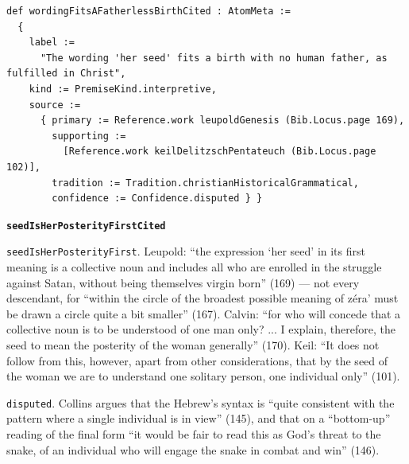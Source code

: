 \documentclass[11pt]{article}
\begin{document}
{\small\begin{verbatim}
def wordingFitsAFatherlessBirthCited : AtomMeta :=
  {
    label :=
      "The wording 'her seed' fits a birth with no human father, as fulfilled in Christ",
    kind := PremiseKind.interpretive,
    source :=
      { primary := Reference.work leupoldGenesis (Bib.Locus.page 169),
        supporting :=
          [Reference.work keilDelitzschPentateuch (Bib.Locus.page 102)],
        tradition := Tradition.christianHistoricalGrammatical,
        confidence := Confidence.disputed } }
\end{verbatim}}
\par\medskip\noindent\textbf{\texttt{seed\allowbreak{}Is\allowbreak{}Her\allowbreak{}Posterity\allowbreak{}First\allowbreak{}Cited}}\par\nobreak\noindent
\texttt{seed\allowbreak{}Is\allowbreak{}Her\allowbreak{}Posterity\allowbreak{}First}. Leupold: “the expression ‘her seed’ in its first meaning is a collective noun and includes all who are enrolled in the struggle against Satan, without being themselves virgin born” (169) — not every descendant, for “within the circle of the broadest possible meaning of zéra’ must be drawn a circle quite a bit smaller” (167). Calvin: “for who will concede that a collective noun is to be understood of one man only? ... I explain, therefore, the seed to mean the posterity of the woman generally” (170). Keil: “It does not follow from this, however, apart from other considerations, that by the seed of the woman we are to understand one solitary person, one individual only” (101).

\texttt{disputed}. Collins argues that the Hebrew’s syntax is “quite consistent with the pattern where a single individual is in view” (145), and that on a “bottom-up” reading of the final form “it would be fair to read this as God’s threat to the snake, of an individual who will engage the snake in combat and win” (146).
\end{document}
